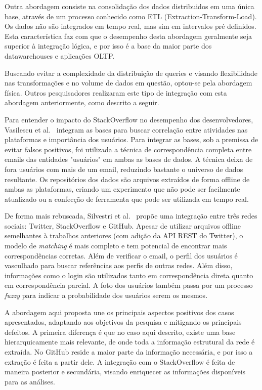 \documentclass[a4paper,12pt]{monografia}
\theoremstyle{plain}
\theoremstyle{definition}
\theoremstyle{remark}
\begin{document}
Outra abordagem consiste na consolidação dos dados distribuidos em uma única base, através de um processo conhecido como ETL (Extraction-Transform-Load). Os dados não são integrados em tempo real, mas sim em intervalos pré definidos. Esta característica faz com que o desempenho desta abordagem geralmente seja superior à integração lógica, e por isso é a base da maior parte dos datawarehouses e aplicações OLTP.

Buscando evitar a complexidade da distribuição de queries e visando flexibilidade nas transformações e no volume de dados em questão, optou-se pela abordagem física. Outros pesquisadores realizaram este tipo de integração com esta abordagem anteriormente, como descrito a seguir.

Para entender o impacto do StackOverflow no desempenho dos desenvolvedores, Vasilescu et al.~\cite{vasilescu2013} integram as bases para buscar correlação entre atividades nas plataformas e importância dos usuários. Para integrar as bases, sob a premissa de evitar falsos positivos, foi utilizada a técnica de correspondência completa entre emails das entidades "usuários" em ambas as bases de dados. A técnica deixa de fora usuários com mais de um email, reduzindo bastante o universo de dados resultante. Os repositórios dos dados são arquivos extraídos de forma offline de ambas as plataformas, criando um experimento que não pode ser facilmente atualizado ou a confecção de ferramenta que pode ser utilizada em tempo real.

De forma mais rebuscada, Silvestri et al.~\cite{silvestri2015} propõe uma integração entre três redes sociais: Twitter, StackOverflow e GitHub. Apesar de utilizar arquivos offline semelhantes à trabalhos anteriores (com adição da API REST do Twitter), o modelo de \textit{matching} é mais completo e tem potencial de encontrar mais correspondências corretas. Além de verificar o email, o perfil dos usuários é vasculhado para buscar referências aos perfis de outras redes. Além disso, informações como o login são utilizados tanto em correspondência direta quanto em correspondência parcial. A foto dos usuários também passa por um processo \textit{fuzzy} para indicar a probabilidade dos usuários serem os mesmos.

A abordagem aqui proposta une os principais aspectos positivos dos casos apresentados, adaptando aos objetivos da pesquisa e mitigando os principais defeitos. A primeira diferença é que no caso aqui descrito, existe uma base hierarquicamente mais relevante, de onde toda a informação estrutural da rede é extraída. No GitHub reside a maior parte da informação necessária, e por isso a extração é feita a partir dele. A integração com o StackOverflow é feita de maneira posterior e secundária, visando enriquecer as informações disponíveis para as análises.
\end{document}
